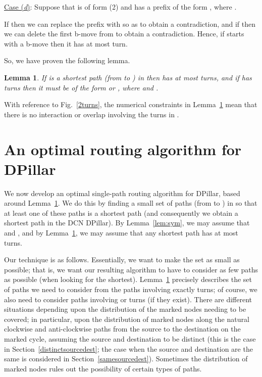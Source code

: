 \documentclass{article}
\newtheorem{lemma}[definition]{Lemma}
\begin{document}
\noindent\underline{Case (\emph{d\/})}: Suppose that  is of form (2) and has a prefix  of the form , where .\smallskip

\noindent If  then we can replace the prefix  with  so as to obtain a contradiction, and if  then we can delete the first b-move from  to obtain a contradiction. Hence, if  starts with a b-move then it has at most  turn.\smallskip

So, we have proven the following lemma.

\begin{lemma}\label{lem:turns}If  is a shortest path (from  to ) in  then  has at most  turns, and if  has  turns then it must be of the form  or , where  and .
\end{lemma}

With reference to Fig.~\ref{2turns}, the numerical constraints in Lemma~\ref{lem:turns} mean that there is no interaction or overlap involving the  turns in .

\section{An optimal routing algorithm for DPillar}\label{sec:algorithm}

We now develop an optimal single-path routing algorithm for DPillar, based around Lemma~\ref{lem:turns}. We do this by finding a small set  of paths (from  to ) in  so that at least one of these paths is a shortest path (and consequently we obtain a shortest path in the DCN DPillar). By Lemma~\ref{lem:sym}, we may assume that  and , and by Lemma~\ref{lem:turns}, we may assume that any shortest path has at most  turns.

Our technique is as follows. Essentially, we want to make the set  as small as possible; that is, we want our resulting algorithm to have to consider as few paths as possible (when looking for the shortest). Lemma~\ref{lem:turns} precisely describes the set of paths we need to consider from the paths involving exactly  turns; of course, we also need to consider paths involving  or  turns (if they exist). There are different situations depending upon the distribution of the marked nodes needing to be covered; in particular, upon the distribution of marked nodes along the natural clockwise and anti-clockwise paths from the source to the destination on the marked cycle, assuming the source and destination to be distinct (this is the case in Section~\ref{distinctsourcedest}; the case when the source and destination are the same is considered in Section~\ref{samesourcedest}). Sometimes the distribution of marked nodes rules out the possibility of certain types of paths.
\end{document}
